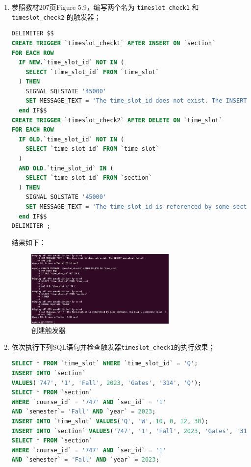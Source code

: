 \documentclass{article}
\renewcommand\tt{\texttt}
\begin{document}
\begin{enumerate}
\item 参照教材207页Figure 5.9，编写两个名为 \tt{timeslot\_check1} 和 \tt{timeslot\_check2} 的触发器；

\begin{lstlisting}[language=sql]
DELIMITER $$
CREATE TRIGGER `timeslot_check1` AFTER INSERT ON `section`
FOR EACH ROW
  IF NEW.`time_slot_id` NOT IN (
    SELECT `time_slot_id` FROM `time_slot`
  ) THEN
    SIGNAL SQLSTATE '45000' 
    SET MESSAGE_TEXT = 'The time_slot_id does not exist. The INSERT operation fails!';
  end IF$$
CREATE TRIGGER `timeslot_check2` AFTER DELETE ON `time_slot`
FOR EACH ROW
  IF OLD.`time_slot_id` NOT IN (
    SELECT `time_slot_id` FROM `time_slot`
  )
  AND OLD.`time_slot_id` IN (
    SELECT `time_slot_id` FROM `section`
  ) THEN
    SIGNAL SQLSTATE '45000' 
    SET MESSAGE_TEXT = 'The time_slot_id is referenced by some sections. The DELETE operation fails!';
  end IF$$
DELIMITER ;
\end{lstlisting}

结果如下：

\begin{figure}[H]
  \centering
  \includegraphics[width=0.7\textwidth]{img/17.png}
  \caption{创建触发器}
\end{figure}

\item 依次执行下列SQL语句并检查触发器\tt{timeslot\_check1}的执行效果；

\begin{lstlisting}[language=sql]
SELECT * FROM `time_slot` WHERE `time_slot_id` = 'Q';
INSERT INTO `section` 
VALUES('747', '1', 'Fall', 2023, 'Gates', '314', 'Q');
SELECT * FROM `section` 
WHERE `course_id` = '747' AND `sec_id` = '1' 
AND `semester`= 'Fall' AND `year` = 2023;
INSERT INTO `time_slot` VALUES('Q', 'W', 10, 0, 12, 30);
INSERT INTO `section` VALUES('747', '1', 'Fall', 2023, 'Gates', '314', 'Q');
SELECT * FROM `section` 
WHERE `course_id` = '747' AND `sec_id` = '1' 
AND `semester` = 'Fall' AND `year` = 2023;
\end{lstlisting}


\end{enumerate}
\end{document}
